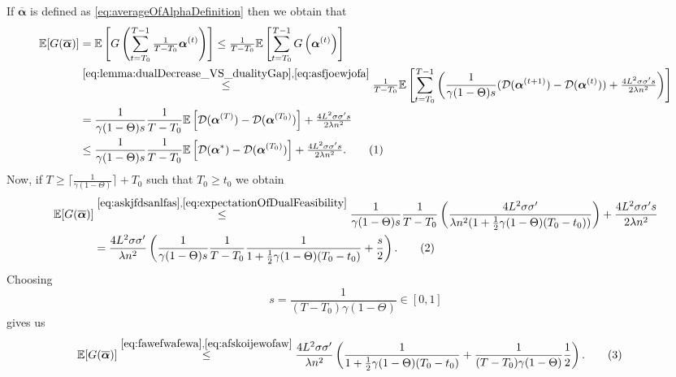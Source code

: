 \documentclass{article}
\newcommand{\Exp}{\mathbb{E}}                      %
\newcommand\tagthis{\addtocounter{equation}{1}\tag{\theequation}}
\newcommand{\calG}{G}
\newcommand{\alphav}{ {\boldsymbol \alpha}}
\newcommand{\0}{ {\bf 0}}
\newcommand{\vc}[2]{#1^{(#2)}}                   %
\newcommand{\bD}{\mathcal{D}}
\theoremstyle{plain}
\theoremstyle{definition}
\begin{document}
If $\overline \alphav$ is defined as \eqref{eq:averageOfAlphaDefinition}
then we obtain that
\begin{align*}
\Exp[\calG(\overline\alphav)] &=  
 \Exp\left[\calG\left(\sum_{t=T_0}^{T-1} \tfrac1{T-T_0} \vc{\alphav}{t}\right)\right]
 \leq
  \tfrac1{T-T_0} \Exp\left[\sum_{t=T_0}^{T-1} \calG\left( \vc{\alphav}{t}\right)\right]
\\
&
\overset{
\eqref{eq:lemma:dualDecrease_VS_dualityGap}
,\eqref{eq:asfjoewjofa}
}{\leq}
  \tfrac1{T-T_0} \Exp\left[\sum_{t=T_0}^{T-1} 
\left(
\frac1{\gamma
(1-\Theta)
 s}
(
\bD(\vc{\alphav}{t+1})
-
\bD(\vc{\alphav}{t})
 )
 +
\tfrac{4L^2 \sigma \sigma' s}{2\lambda n^2 }
\right)  
  \right]
\\  
 &=
\frac1{\gamma
(1-\Theta)
 s}
   \frac1{T-T_0} 
   \Exp\left[
\bD(\vc{\alphav}{T})
-
\bD(\vc{\alphav}{T_0})
  \right] 
+\tfrac{4L^2 \sigma \sigma' s}{2\lambda n^2 }  
\\  
 &\leq
\frac1{\gamma
(1-\Theta)
 s}
   \frac1{T-T_0} 
   \Exp\left[
\bD(\alphav^*)
-
\bD(\vc{\alphav}{T_0})
  \right] 
+\tfrac{4L^2 \sigma \sigma' s}{2\lambda n^2 }.  
\tagthis \label{eq:askjfdsanlfas}
  \end{align*}
Now, if $T\geq \lceil
\frac1{\gamma (1-\Theta)}\rceil+T_0$ such that $T_0\geq t_0$
we obtain
\begin{align*}
\Exp[\calG(\overline\alphav)] 
&\overset{\eqref{eq:askjfdsanlfas}
,\eqref{eq:expectationOfDualFeasibility}
}{\leq}
\frac1{\gamma
(1-\Theta)
 s}
   \frac1{T-T_0} 
\left(
\frac{4L^2  \sigma   \sigma'}{\lambda n^2( 1+ \frac12  \gamma (1-\Theta)  (T_0-t_0))}
\right)
+\frac{4L^2 \sigma \sigma' s}{2\lambda n^2 }
\\
&=
\frac{
4L^2  \sigma   \sigma'}{\lambda n^2}
\left(
\frac1{\gamma
(1-\Theta)
 s}
   \frac1{T-T_0} 
\frac{1}{ 1+ \frac12  \gamma (1-\Theta)  (T_0-t_0)}
+\frac{  s}{2 }
\right). 
\tagthis
\label{eq:fawefwafewa}
\end{align*}
Choosing 
\begin{equation}
\label{eq:afskoijewofaw}
s=\frac{1}{(T-T_0) \gamma (1-\Theta)} \in [0,1]
\end{equation}
gives us
\begin{align*}
\Exp[\calG(\overline\alphav)] 
&
\overset{\eqref{eq:fawefwafewa},
\eqref{eq:afskoijewofaw}}{\leq}
\frac{
4L^2  \sigma   \sigma'}{\lambda n^2}
\left(
\frac{1}{ 1+ \frac12  \gamma (1-\Theta)  (T_0-t_0)}
+\frac{1}{(T-T_0) \gamma (1-\Theta)} \frac{  1}{2 }
\right). \tagthis
\label{eq:afsjweofjwafea}
\end{align*}
\end{document}
